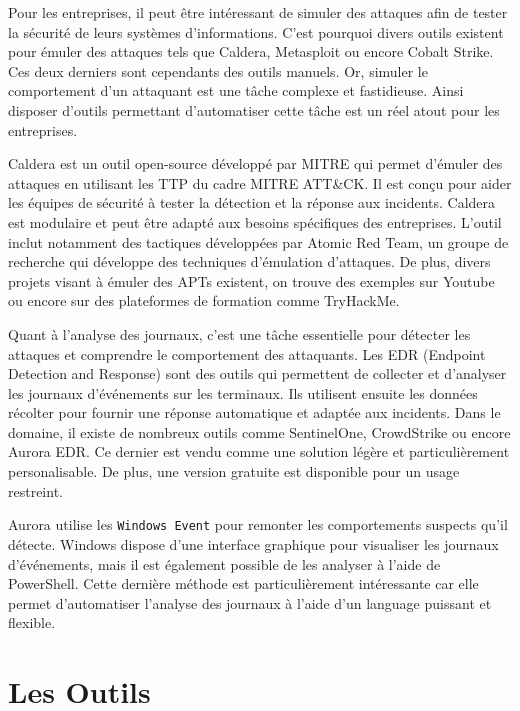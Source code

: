 \documentclass[12pt,letterpaper]{article}
\begin{document}
\bigskip

Pour les entreprises, il peut être intéressant de simuler des attaques afin de tester la sécurité de leurs systèmes d'informations.
C'est pourquoi divers outils existent pour émuler des attaques tels que Caldera, Metasploit ou encore Cobalt Strike.
Ces deux derniers sont cependants des outils manuels. Or, simuler le comportement d'un attaquant est une tâche complexe et fastidieuse.
Ainsi disposer d'outils permettant d'automatiser cette tâche est un réel atout pour les entreprises.

\bigskip

Caldera est un outil open-source développé par MITRE qui permet d'émuler des attaques en utilisant les TTP du cadre MITRE ATT\&CK.
Il est conçu pour aider les équipes de sécurité à tester la détection et la réponse aux incidents.
Caldera est modulaire et peut être adapté aux besoins spécifiques des entreprises.
L'outil inclut notamment des tactiques développées par Atomic Red Team, un groupe de recherche qui développe des techniques d'émulation d'attaques.
De plus, divers projets visant à émuler des APTs existent, on trouve des exemples sur Youtube ou encore sur des plateformes de formation comme TryHackMe.

\bigskip

Quant à l'analyse des journaux, c'est une tâche essentielle pour détecter les attaques et comprendre le comportement des attaquants.
Les EDR (Endpoint Detection and Response) sont des outils qui permettent de collecter et d'analyser les journaux d'événements sur les terminaux.
Ils utilisent ensuite les données récolter pour fournir une réponse automatique et adaptée aux incidents.
Dans le domaine, il existe de nombreux outils comme SentinelOne, CrowdStrike ou encore Aurora EDR.
Ce dernier est vendu comme une solution légère et particulièrement personalisable.
De plus, une version gratuite est disponible pour un usage restreint.

\bigskip

Aurora utilise les \verb|Windows Event| pour remonter les comportements suspects qu'il détecte.
Windows dispose d'une interface graphique pour visualiser les journaux d'événements, mais il est également possible de les analyser à l'aide de PowerShell.
Cette dernière méthode est particulièrement intéressante car elle permet d'automatiser l'analyse des journaux à l'aide d'un language puissant et flexible.

\newpage
\section{Les Outils}
\end{document}
